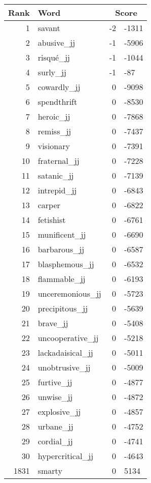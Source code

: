 \begin{longtable}[!htbp]{| rlr@{.}l |}
    \hline
    \textbf{Rank} & \textbf{Word} & \multicolumn{2}{c|}{\textbf{Score}} \\
    \hline
    \endhead
    1 & savant & -2 & -1311 \\
    2 & abusive\_jj & -1 & -5906 \\
    3 & risqué\_jj & -1 & -1044 \\
    4 & surly\_jj & -1 & -87 \\
    5 & cowardly\_jj & 0 & -9098 \\
    6 & spendthrift & 0 & -8530 \\
    7 & heroic\_jj & 0 & -7868 \\
    8 & remiss\_jj & 0 & -7437 \\
    9 & visionary & 0 & -7391 \\
    10 & fraternal\_jj & 0 & -7228 \\
    11 & satanic\_jj & 0 & -7139 \\
    12 & intrepid\_jj & 0 & -6843 \\
    13 & carper & 0 & -6822 \\
    14 & fetishist & 0 & -6761 \\
    15 & munificent\_jj & 0 & -6690 \\
    16 & barbarous\_jj & 0 & -6587 \\
    17 & blasphemous\_jj & 0 & -6532 \\
    18 & flammable\_jj & 0 & -6193 \\
    19 & unceremonious\_jj & 0 & -5723 \\
    20 & precipitous\_jj & 0 & -5639 \\
    21 & brave\_jj & 0 & -5408 \\
    22 & uncooperative\_jj & 0 & -5218 \\
    23 & lackadaisical\_jj & 0 & -5011 \\
    24 & unobtrusive\_jj & 0 & -5009 \\
    25 & furtive\_jj & 0 & -4877 \\
    26 & unwise\_jj & 0 & -4872 \\
    27 & explosive\_jj & 0 & -4857 \\
    28 & urbane\_jj & 0 & -4752 \\
    29 & cordial\_jj & 0 & -4741 \\
    30 & hypercritical\_jj & 0 & -4643 \\
    1831 & smarty & 0 & 5134 \\

\end{longtable}
